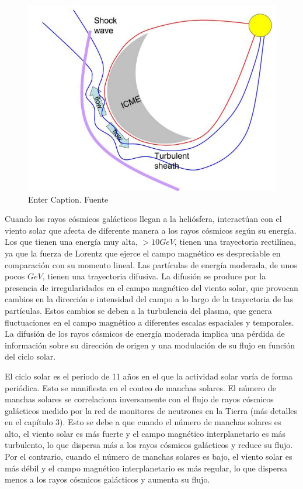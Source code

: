 \begin{figure}[H]
    \centering
    \includegraphics[width=0.5\linewidth]{Figs/Dessin_ICME_sm_0.jpg}
    \caption{Enter Caption. Fuente \cite{NMDB}}
    \label{imce}
\end{figure}
Cuando los rayos cósmicos galácticos llegan a la heliósfera, interactúan con el viento solar que afecta de diferente manera a los rayos cósmicos según su energía. Los que tienen una energía muy alta, $>10GeV$,  tienen una trayectoria rectilínea, ya que la fuerza de Lorentz que ejerce el campo magnético es despreciable en comparación con su momento lineal. Las partículas de energía moderada, de unos pocos $GeV$, tienen una trayectoria difusiva. La difusión se produce por la presencia de irregularidades en el campo magnético del viento solar, que provocan cambios en la dirección e intensidad del campo a lo largo de la trayectoria de las partículas. Estos cambios se deben a la turbulencia del plasma, que genera fluctuaciones en el campo magnético a diferentes escalas espaciales y temporales. La difusión de los rayos cósmicos de energía moderada implica una pérdida de información sobre su dirección de origen y una modulación de su flujo en función del ciclo solar.

El ciclo solar es el periodo de 11 años en el que la actividad solar varía de forma periódica. Esto se manifiesta en el conteo de manchas solares. El número de manchas solares se correlaciona inversamente con el flujo de rayos cósmicos galácticos medido por la red de monitores de neutrones en la Tierra (más detalles en el capítulo 3). Esto se debe a que cuando el número de manchas solares es alto, el viento solar es más fuerte y el campo magnético interplanetario es más turbulento, lo que dispersa más a los rayos cósmicos galácticos y reduce su flujo. Por el contrario, cuando el número de manchas solares es bajo, el viento solar es más débil y el campo magnético interplanetario es más regular, lo que dispersa menos a los rayos cósmicos galácticos y aumenta su flujo.

